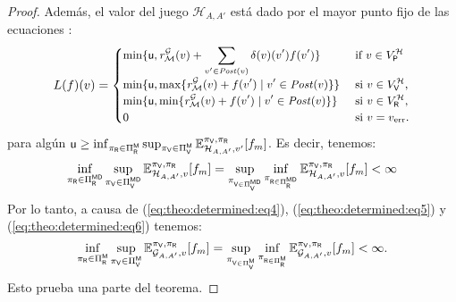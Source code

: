 \begin{proof}
    Además, el valor del juego $\mathcal{H}_{A,A'}$ está dado por el mayor punto fijo de las ecuaciones \cite{CastroDDP22}:
\begin{equation}\label{eq:theo:determined:bellman1}\small
    L(f)(v) =
    \begin{cases}
           \displaystyle \min \{\mathsf{u}, \mathit{r}_{\mathcal{M}}^{\mathcal{G}}(v) + \sum_{v' \in \mathit{Post}(v)} \delta(v)(v')  f(v') \} & \text{ if } v \in V^{\mathcal{H}}_{\mathsf{P}}  \\
           \displaystyle \min \{\mathsf{u},  \max \{\mathit{r}_{\mathcal{M}}^{\mathcal{G}}(v) +f(v') \mid v' \in \mathit{Post}(v) \} \} & \text{ si } v \in  V^{\mathcal{H}}_{\mathsf{V}}, \\
           \displaystyle \min \{\mathsf{u},  \min \{\mathit{r}_{\mathcal{M}}^{\mathcal{G}}(v)  + f(v') \mid v' \in \mathit{Post}(v) \} \} & \text{ si } v \in  V^{\mathcal{H}}_{\mathsf{R}}, \\
           \displaystyle 0 & \text{ si } v=v_{\text{err}}.
           \displaystyle 
    \end{cases}
\end{equation}
    para algún $\mathsf{u} \geq \inf_{\pi_{\mathsf{R}} \in \Pi_{\mathsf{R}}^{\mathsf{M}}} \sup_{\pi_{\mathsf{V}} \in \Pi_{\mathsf{V}}^{\mathsf{M}}} \mathbb{E}_{\mathcal{H}_{A,A'},v'}^{\pi_{\mathsf{V}},\pi_{\mathsf{R}}}[f_{m}]$.
    Es decir, tenemos:
\begin{equation}\label{eq:theo:determined:eq6}
    \inf_{\pi_{\mathsf{R}} \in \Pi_{\mathsf{R}}^{\mathsf{M}\mathsf{D}}} \sup_{\pi_{\mathsf{V}} \in \Pi_{\mathsf{V}}^{\mathsf{M}\mathsf{D}}}  \mathbb{E}^{\pi_{\mathsf{V}},\pi_{\mathsf{R}}}_{\mathcal{H}_{A,A'}, v}[f_{m}] 
    = \sup_{\pi_{\mathsf{V} \in \Pi_{\mathsf{V}}^{\mathsf{M}\mathsf{D}}}} \inf_{\pi_{\mathsf{R} \in \Pi_{\mathsf{R}}^{\mathsf{M}\mathsf{D}}}}    \mathbb{E}^{\pi_{\mathsf{V}},\pi_{\mathsf{R}}}_{\mathcal{H}_{A,A'}, v}[f_{m}] 
    < \infty
\end{equation}
  Por lo tanto, a causa de (\ref{eq:theo:determined:eq4}),  (\ref{eq:theo:determined:eq5}) y (\ref{eq:theo:determined:eq6}) tenemos:
\[
 \inf_{\pi_{\mathsf{R}} \in \Pi_{\mathsf{R}}^{\mathsf{M}}} \sup_{\pi_{\mathsf{V}} \in \Pi_{\mathsf{V}}^{\mathsf{M}}}  \mathbb{E}^{\pi_{\mathsf{V}},\pi_{\mathsf{R}}}_{\mathcal{G}_{A,A'}, v}[f_{m}] 
    = \sup_{\pi_{\mathsf{V} \in \Pi_{\mathsf{V}}^{\mathsf{M}}}} \inf_{\pi_{\mathsf{R} \in \Pi_{\mathsf{R}}^{\mathsf{M}}}}    \mathbb{E}^{\pi_{\mathsf{V}},\pi_{\mathsf{R}}}_{\mathcal{G}_{A,A'}, v}[f_{m}] 
    < \infty.
\]
    Esto prueba una parte del teorema.

\end{proof}
